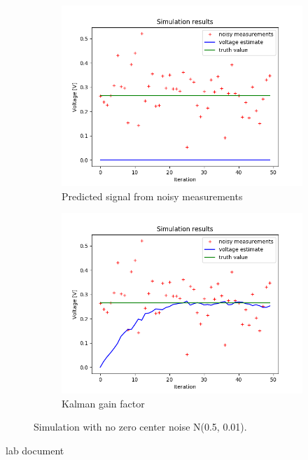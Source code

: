 \documentclass{article}
\begin{document}
    \begin{figure}
        \begin{subfigure} {.5\textwidth}  
            \centering 
            \includegraphics[width=0.8\linewidth]{./img/P0_.png}
            \caption{Predicted signal from noisy measurements }
        \end{subfigure}
        \begin{subfigure}{.5\textwidth}            
            \centering
            \includegraphics[width=0.8\linewidth]{./img/P001_.png}
            \caption{Kalman gain factor}
        \end{subfigure}
        \caption{Simulation with no zero center noise N(0.5, 0.01).}
        \label{fig:simulation7}
    \end{figure}
    
    

    lab document
\end{document}
